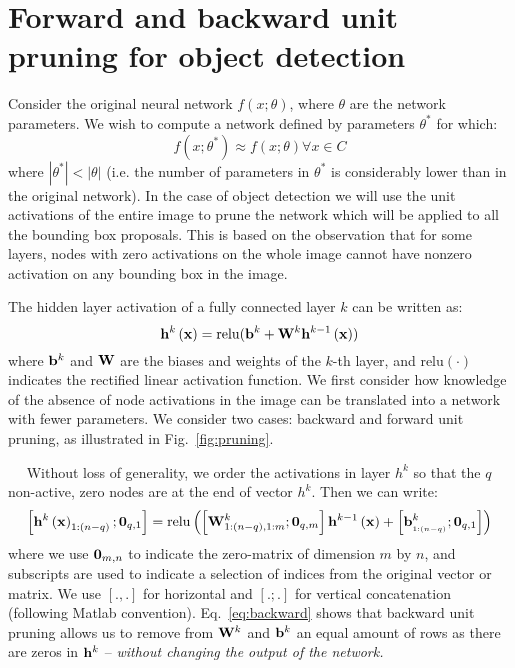 \documentclass{article}
\newcommand{\minisection}[1]{\vspace{0.04in} \noindent {\bf #1}\ \ }
\begin{document}
\section{Forward and backward unit pruning for object detection}
Consider the original neural network $f\left( {x;\theta } \right)$,
where $\theta$ are the network parameters. We wish to compute a
network defined by parameters $\theta^*$ for which:
\begin{equation}
f\left( {x;\theta ^* } \right) \approx f\left( {x;\theta } \right)\forall x \in C
\end{equation}
where $\left| {\theta ^* } \right| < \left| \theta \right|$ (i.e.  the
number of parameters in $\theta^*$ is considerably lower than in the
original network). In the case of object detection we will use the unit
activations of the entire image to prune the network which will be
applied to all the bounding box proposals. This is based on the
observation that for some layers, nodes with zero activations on the
whole image cannot have nonzero activation on any bounding box in the image.

The hidden layer activation of a fully connected layer $k$ can be
written as:
\begin{equation}{\bf{h}}^k \left( {\bf{x}} \right) = \mathrm{relu}( {{\bf{b}}^k  + {\bf{W}}^k {\bf{h}}^{k - 1} \left( {\bf{x}} \right)} )
\end{equation}
where ${\bf{b}}^k$ and ${\bf{W}}$ are the biases and weights of the
$k$-th layer, and $\mathrm{relu}(\cdot)$ indicates the rectified
linear activation function.  We first consider how knowledge of the
absence of node activations in the image can be
translated into a network with fewer parameters. We consider two
cases: backward and forward unit pruning, as illustrated in Fig.~\ref{fig:pruning}.

\minisection{Backward unit pruning:} Without loss of generality, we
order the activations in layer $h^k$ so that the $q$ non-active, zero
nodes are at the end of vector $h^k$. Then we can write:
\begin{equation}
\left[ {{\bf{h}}^k \left( {\bf{x}} \right)_{1:\left( {n - q} \right)} ;{\bf{0}}_{q,1} } \right] = \mathrm{relu}\left( {\left[ {{\bf{W}}^k _{1:\left( {n - q} \right),1:m} ;{\bf{0}}_{q,m} } \right]{\bf{h}}^{k - 1} \left( {\bf{x}} \right) + \left[ {{\bf{b}}^k _{_{1:\left( {n - q} \right)} } ;{\bf{0}}_{q,1} } \right]} \right)
\label{eq:backward}
\end{equation}
where we use ${\bf{0}}_{m,n}$ to indicate the zero-matrix of
dimension $m$ by $n$, and subscripts are used to indicate a selection
of indices from the original vector or matrix. We use
$\left[ {.,.} \right]$ for horizontal and $\left[ {.;.} \right]$ for
vertical concatenation (following Matlab
convention). Eq.~\ref{eq:backward} shows that backward unit pruning
allows us to remove from ${\bf{W}}^k$ and ${\bf{b}}^k$ an equal amount
of rows as there are zeros in ${\bf{h}}^k$ -- \emph{without changing 
the output of the network.}
\end{document}
